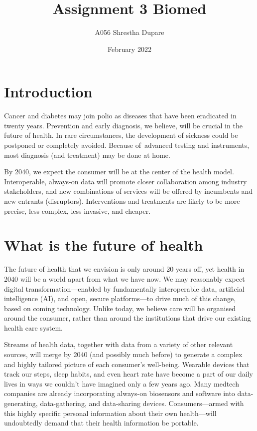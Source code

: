 \documentclass[11pt]{article}
\title{Assignment 3 Biomed}
\author{A056 Shrestha Dupare}
\date{February 2022}
\begin{document}
\maketitle

\section{Introduction}

Cancer and diabetes may join polio as diseases that have been eradicated in twenty years. Prevention and early diagnosis, we believe, will be crucial in the future of health. In rare circumstances, the development of sickness could be postponed or completely avoided. Because of advanced testing and instruments, most diagnosis (and treatment) may be done at home.


By 2040, we expect the consumer will be at the center of the health model. Interoperable, always-on data will promote closer collaboration among industry stakeholders, and new combinations of services will be offered by incumbents and new entrants (disruptors). Interventions and treatments are likely to be more precise, less complex, less invasive, and cheaper.


\section{What is the future of health}

The future of health that we envision is only around 20 years off, yet health in 2040 will be a world apart from what we have now. We may reasonably expect digital transformation—enabled by fundamentally interoperable data, artificial intelligence (AI), and open, secure platforms—to drive much of this change, based on coming technology. Unlike today, we believe care will be organised around the consumer, rather than around the institutions that drive our existing health care system.


Streams of health data, together with data from a variety of other relevant sources, will merge by 2040 (and possibly much before) to generate a complex and highly tailored picture of each consumer's well-being. Wearable devices that track our steps, sleep habits, and even heart rate have become a part of our daily lives in ways we couldn't have imagined only a few years ago. Many medtech companies are already incorporating always-on biosensors and software into data-generating, data-gathering, and data-sharing devices. Consumers—armed with this highly specific personal information about their own health—will undoubtedly demand that their health information be portable.
\end{document}
